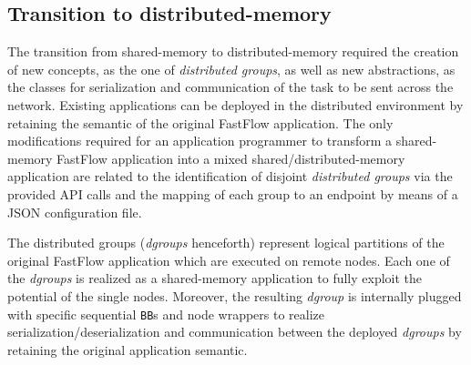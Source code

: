 \subsection{Transition to distributed-memory}
The transition from shared-memory to distributed-memory required the creation of new concepts, as the one of \textit{distributed groups}, as well as new abstractions, as the classes for serialization and communication of the task to be sent across the network. Existing applications can be deployed in the distributed environment by retaining the semantic of the original FastFlow application. The only modifications required for an application programmer to transform a shared-memory FastFlow application into a mixed shared/distributed-memory application are related to the identification of disjoint \textit{distributed groups} via the provided API calls and the mapping of each group to an endpoint by means of a JSON configuration file.

The distributed groups (\textit{dgroups} henceforth) represent logical partitions of the original FastFlow application which are executed on remote nodes. Each one of the \textit{dgroups} is realized as a shared-memory application to fully exploit the potential of the single nodes. Moreover, the resulting \textit{dgroup} is internally plugged with specific sequential \texttt{BB}s and node wrappers to realize serialization/deserialization and communication between the deployed \textit{dgroups} by retaining the original application semantic.

